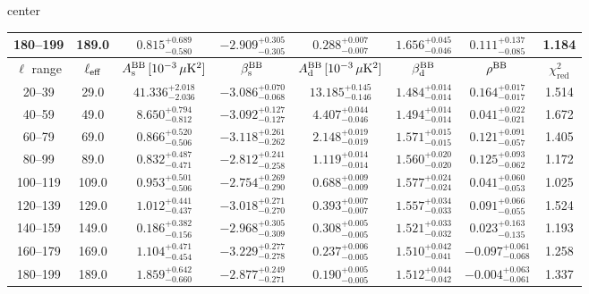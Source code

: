 \begin{table}[h]
\begin{adjustbox}{center}
\begin{tabular}{cccccccc}
180--199 & 189.0 & $0.815^{+0.689}_{-0.580}$ & $-2.909^{+0.305}_{-0.305}$ & $0.288^{+0.007}_{-0.007}$ & $1.656^{+0.045}_{-0.046}$ & $0.111^{+0.137}_{-0.085}$ & 1.184 \\
\midrule
$\ell$ range & $\ell_{\rm eff}$ & $A^{\rm BB}_{\rm s}\,[10^{-3}\,\mu\mathrm{K}^2]$ & $\beta^{\rm BB}_{\rm s}$ & $A^{\rm BB}_{\rm d}\,[10^{-3}\,\mu\mathrm{K}^2]$ & $\beta^{\rm BB}_{\rm d}$ & $\rho^{\rm BB}$ & $\chi^2_\mathrm{red}$ \\
\midrule
20--39 & 29.0 & $41.336^{+2.018}_{-2.036}$ & $-3.086^{+0.070}_{-0.068}$ & $13.185^{+0.145}_{-0.146}$ & $1.484^{+0.014}_{-0.014}$ & $0.164^{+0.017}_{-0.017}$ & 1.514 \\
40--59 & 49.0 & $8.650^{+0.794}_{-0.812}$ & $-3.092^{+0.127}_{-0.127}$ & $4.407^{+0.044}_{-0.046}$ & $1.494^{+0.014}_{-0.014}$ & $0.041^{+0.022}_{-0.021}$ & 1.672 \\
60--79 & 69.0 & $0.866^{+0.520}_{-0.506}$ & $-3.118^{+0.261}_{-0.262}$ & $2.148^{+0.019}_{-0.019}$ & $1.571^{+0.015}_{-0.015}$ & $0.121^{+0.091}_{-0.057}$ & 1.405 \\
80--99 & 89.0 & $0.832^{+0.487}_{-0.471}$ & $-2.812^{+0.241}_{-0.258}$ & $1.119^{+0.014}_{-0.014}$ & $1.560^{+0.020}_{-0.020}$ & $0.125^{+0.093}_{-0.062}$ & 1.172 \\
100--119 & 109.0 & $0.953^{+0.501}_{-0.506}$ & $-2.754^{+0.269}_{-0.290}$ & $0.688^{+0.009}_{-0.009}$ & $1.577^{+0.024}_{-0.024}$ & $0.041^{+0.060}_{-0.053}$ & 1.025 \\
120--139 & 129.0 & $1.012^{+0.441}_{-0.437}$ & $-3.018^{+0.271}_{-0.270}$ & $0.393^{+0.007}_{-0.007}$ & $1.557^{+0.034}_{-0.033}$ & $0.091^{+0.066}_{-0.055}$ & 1.524 \\
140--159 & 149.0 & $0.186^{+0.382}_{-0.156}$ & $-2.968^{+0.305}_{-0.309}$ & $0.308^{+0.005}_{-0.005}$ & $1.521^{+0.033}_{-0.032}$ & $0.023^{+0.163}_{-0.135}$ & 1.193 \\
160--179 & 169.0 & $1.104^{+0.471}_{-0.454}$ & $-3.229^{+0.277}_{-0.278}$ & $0.237^{+0.006}_{-0.005}$ & $1.510^{+0.042}_{-0.041}$ & $-0.097^{+0.061}_{-0.068}$ & 1.258 \\
180--199 & 189.0 & $1.859^{+0.642}_{-0.660}$ & $-2.877^{+0.249}_{-0.271}$ & $0.190^{+0.005}_{-0.005}$ & $1.512^{+0.044}_{-0.042}$ & $-0.004^{+0.063}_{-0.061}$ & 1.337 \\
\bottomrule
\end{tabular}
\end{adjustbox}
\end{table}
